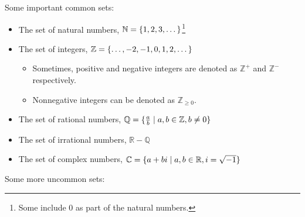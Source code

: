 Some important common sets:
\begin{itemize}
    \item The set of natural numbers, \(\mathbb{N}=\{1,2,3,\dots\}\)\footnote{Some include \(0\) as part of the natural numbers.}
    \item The set of integers, \(\mathbb{Z}=\{\dots,-2,-1,0,1,2,\dots\}\)
    \begin{itemize}
        \item Sometimes, positive and negative integers are denoted as \(\mathbb{Z}^+\) and \(\mathbb{Z}^-\) respectively.
        \item Nonnegative integers can be denoted as \(\mathbb{Z}_{\ge0}\).
    \end{itemize}
    \item The set of rational numbers, \(\mathbb{Q}=\{\frac{a}{b}\mid a,b\in\mathbb{Z},b\ne0\}\)
    \item The set of irrational numbers, \(\mathbb{R}-\mathbb{Q}\)
    \item The set of complex numbers, \(\mathbb{C}=\{a+bi\mid a,b\in\mathbb{R},i=\sqrt{-1}\}\)
\end{itemize}
Some more uncommon sets:
